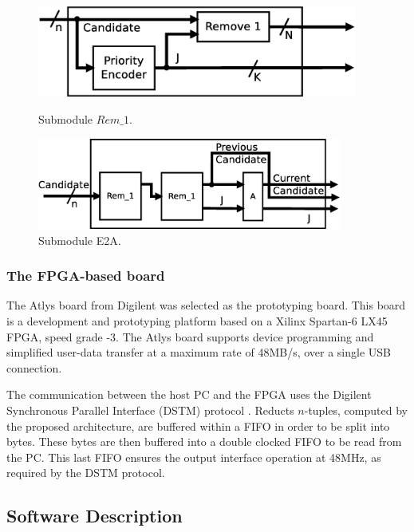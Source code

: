 \documentclass[authoryear,preprint,review,12pt]{elsarticle}
\begin{document}
\begin{figure}[htb]
\centering
\begin{minipage}{.5\textwidth}
  \centering
   \includegraphics[width=\linewidth , height=3cm]{Rem1.eps}
  \caption{Submodule $Rem\_1$.}
  \label{fig:subRem1}
\end{minipage}%
\begin{minipage}{.5\textwidth}
  \centering
   \includegraphics[width=\linewidth , height=3cm]{EA2.eps}
  \caption{Submodule E2A.}
  \label{fig:subEA2}
\end{minipage}
\end{figure}

\subsubsection*{The FPGA-based board}
The Atlys board from Digilent \citep{R15} was selected as the prototyping board. This board is 
a development and prototyping platform based on a Xilinx Spartan-6 LX45 FPGA, speed grade -3. The Atlys board 
supports device programming and simplified user-data transfer at a maximum rate of 48MB/s, over 
a single USB connection. 

The communication between the host PC and the FPGA uses the Digilent Synchronous 
Parallel Interface (DSTM) protocol \citep{R25}. Reducts $n$-tuples, computed by the 
proposed architecture, are buffered within a FIFO in order to be split into bytes. These bytes 
are then buffered into a double clocked FIFO \citep{R26} to be read from the PC. This last FIFO 
ensures the output interface operation at 48MHz, as required by the DSTM protocol.

\subsection{Software Description}
\label{sect:5}
\end{document}
